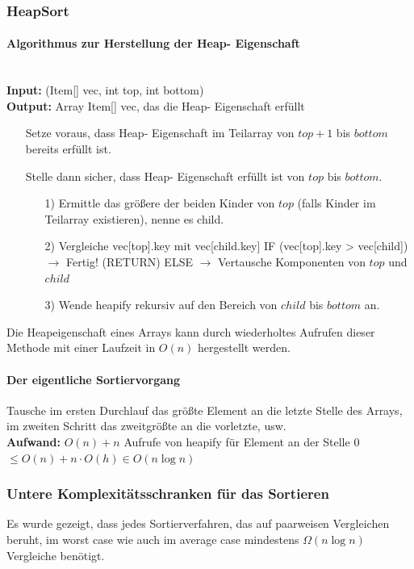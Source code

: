 \documentclass[fleqn]{scrartcl}
\begin{document}
\subsubsection{HeapSort}
\paragraph{Algorithmus zur Herstellung der Heap- Eigenschaft} $ $\\
\textbf{Input:} (Item[] vec, int top, int bottom)\\
\textbf{Output:} Array Item[] vec, das die Heap- Eigenschaft erfüllt
\begin{itemize}
\item[] Setze voraus, dass Heap- Eigenschaft im Teilarray von $top + 1$ bis $bottom$ bereits erfüllt ist.
\item[] Stelle dann sicher, dass Heap- Eigenschaft erfüllt ist von $top$ bis $bottom$.
\begin{itemize}
\item[1)] Ermittle das größere der beiden Kinder von $top$ (falls Kinder im Teilarray existieren), nenne es child.
\item[2)] Vergleiche vec[top].key mit vec[child.key]
\subitem IF (vec[top].key > vec[child])
\subsubitem$\rightarrow$ Fertig! (RETURN)
\subitem ELSE
\subsubitem$\rightarrow$ Vertausche Komponenten von $top$ und $child$
\item[3)] Wende heapify rekursiv auf den Bereich von $child$ bis $bottom$ an.
\end{itemize}
\end{itemize}

Die Heapeigenschaft eines Arrays kann durch wiederholtes Aufrufen dieser Methode mit einer Laufzeit in $O (n)$ hergestellt werden.

\paragraph{Der eigentliche Sortiervorgang}
Tausche im ersten Durchlauf das größte Element an die letzte Stelle des Arrays, im zweiten Schritt das zweitgrößte an die vorletzte, usw.\\
\textbf{Aufwand:} $O(n) + n$ Aufrufe von heapify für Element an der Stelle 0 $\leq O(n) + n \cdot O(h) \in O (n \log n)$

\subsubsection{Untere Komplexitätsschranken für das Sortieren}
Es wurde gezeigt, dass jedes Sortierverfahren, das auf paarweisen Vergleichen beruht, im worst case wie auch im average case mindestens $\Omega (n \log n)$ Vergleiche benötigt.
\end{document}
